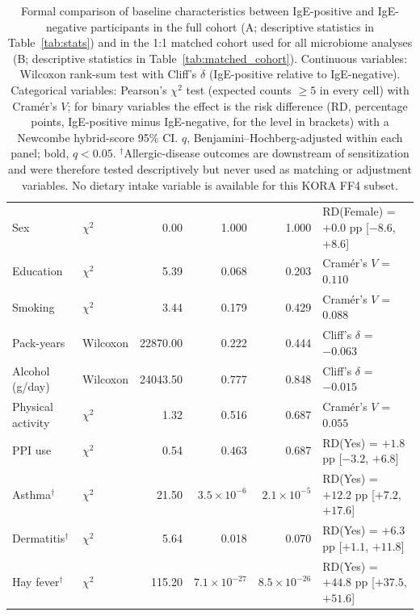 \begin{table}[h!]
\begin{tabular}{l l r r r l}
Sex & $\chi^2$ & 0.00 & 1.000 & 1.000 & RD(Female) = $+0.0$ pp [$-8.6$, $+8.6$] \\
Education & $\chi^2$ & 5.39 & 0.068 & 0.203 & Cram\'er's $V$ = $0.110$ \\
Smoking & $\chi^2$ & 3.44 & 0.179 & 0.429 & Cram\'er's $V$ = $0.088$ \\
Pack-years & Wilcoxon & 22870.00 & 0.222 & 0.444 & Cliff's $\delta$ = $-0.063$ \\
Alcohol (g/day) & Wilcoxon & 24043.50 & 0.777 & 0.848 & Cliff's $\delta$ = $-0.015$ \\
Physical activity & $\chi^2$ & 1.32 & 0.516 & 0.687 & Cram\'er's $V$ = $0.055$ \\
PPI use & $\chi^2$ & 0.54 & 0.463 & 0.687 & RD(Yes) = $+1.8$ pp [$-3.2$, $+6.8$] \\
Asthma$^{\dagger}$ & $\chi^2$ & 21.50 & $3.5\times10^{-6}$ & \textbf{$2.1\times10^{-5}$} & RD(Yes) = $+12.2$ pp [$+7.2$, $+17.6$] \\
Dermatitis$^{\dagger}$ & $\chi^2$ & 5.64 & 0.018 & 0.070 & RD(Yes) = $+6.3$ pp [$+1.1$, $+11.8$] \\
Hay fever$^{\dagger}$ & $\chi^2$ & 115.20 & $7.1\times10^{-27}$ & \textbf{$8.5\times10^{-26}$} & RD(Yes) = $+44.8$ pp [$+37.5$, $+51.6$] \\
\hline
\end{tabular}
\caption{Formal comparison of baseline characteristics between IgE-positive and IgE-negative participants in the full cohort (A; descriptive statistics in Table~\ref{tab:stats}) and in the 1:1 matched cohort used for all microbiome analyses (B; descriptive statistics in Table~\ref{tab:matched_cohort}). Continuous variables: Wilcoxon rank-sum test with Cliff's $\delta$ (IgE-positive relative to IgE-negative). Categorical variables: Pearson's $\chi^2$ test (expected counts $\geq 5$ in every cell) with Cram\'er's $V$; for binary variables the effect is the risk difference (RD, percentage points, IgE-positive minus IgE-negative, for the level in brackets) with a Newcombe hybrid-score 95\% CI. $q$, Benjamini--Hochberg-adjusted within each panel; bold, $q < 0.05$. $^{\dagger}$Allergic-disease outcomes are downstream of sensitization and were therefore tested descriptively but never used as matching or adjustment variables. No dietary intake variable is available for this KORA FF4 subset.\label{tab:baseline_tests}}
\end{table}
